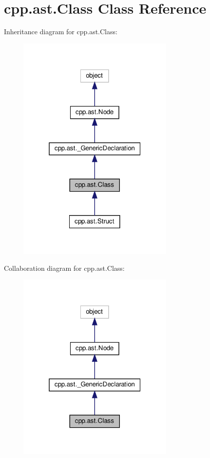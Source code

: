 \hypertarget{classcpp_1_1ast_1_1_class}{}\section{cpp.\+ast.\+Class Class Reference}
\label{classcpp_1_1ast_1_1_class}


Inheritance diagram for cpp.\+ast.\+Class\+:
\nopagebreak
\begin{figure}[H]
\begin{center}
\leavevmode
\includegraphics[width=220pt]{classcpp_1_1ast_1_1_class__inherit__graph}
\end{center}
\end{figure}


Collaboration diagram for cpp.\+ast.\+Class\+:
\nopagebreak
\begin{figure}[H]
\begin{center}
\leavevmode
\includegraphics[width=220pt]{classcpp_1_1ast_1_1_class__coll__graph}
\end{center}
\end{figure}

